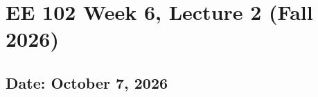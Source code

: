 \documentclass{ee102_notes}
\renewcommand{\releasedate}{October 7, 2026}
\begin{document}
\section*{EE 102 Week 6, Lecture 2 (Fall 2026)}
\subsection*{Date: \releasedate}
\tableofcontents

\end{document}
